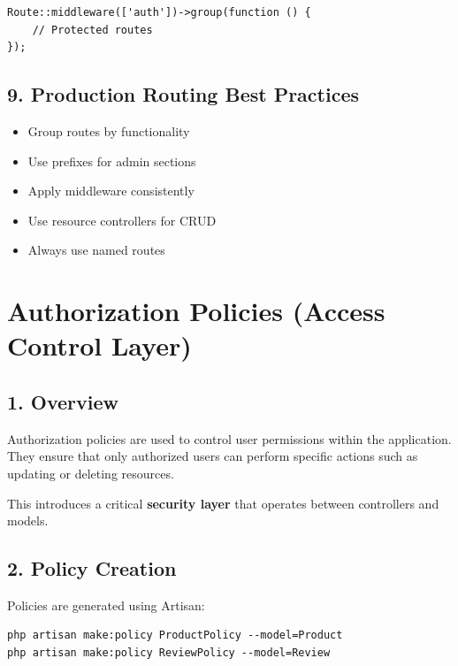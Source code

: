 \documentclass[12pt,a4paper]{article}
\begin{document}
\begin{verbatim}
Route::middleware(['auth'])->group(function () {
    // Protected routes
});
\end{verbatim}

\subsection{9. Production Routing Best Practices}

\begin{itemize}[noitemsep]
    \item Group routes by functionality
    \item Use prefixes for admin sections
    \item Apply middleware consistently
    \item Use resource controllers for CRUD
    \item Always use named routes
\end{itemize}


\section{Authorization Policies (Access Control Layer)}

\subsection{1. Overview}

Authorization policies are used to control user permissions within the application. They ensure that only authorized users can perform specific actions such as updating or deleting resources.

This introduces a critical \textbf{security layer} that operates between controllers and models.

\subsection{2. Policy Creation}

Policies are generated using Artisan:

\begin{verbatim}
php artisan make:policy ProductPolicy --model=Product
php artisan make:policy ReviewPolicy --model=Review
\end{verbatim}
\end{document}
